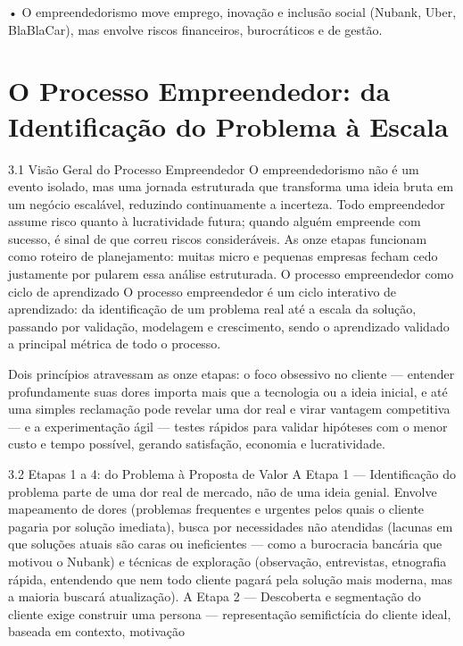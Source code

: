 • O empreendedorismo move emprego, inovação e inclusão social (Nubank, Uber, BlaBlaCar), mas envolve riscos financeiros, burocráticos e de gestão.

\chapter{O Processo Empreendedor: da Identificação do Problema à Escala}

3.1 Visão Geral do Processo Empreendedor O empreendedorismo não é um evento isolado, mas uma jornada estruturada que transforma uma ideia bruta em um negócio escalável, reduzindo continuamente a incerteza. Todo empreendedor assume risco quanto à lucratividade futura; quando alguém empreende com sucesso, é sinal de que correu riscos consideráveis. As onze etapas funcionam como roteiro de planejamento: muitas micro e pequenas empresas fecham cedo justamente por pularem essa análise estruturada. O processo empreendedor como ciclo de aprendizado O processo empreendedor é um ciclo interativo de aprendizado: da identificação de um problema real até a escala da solução, passando por validação, modelagem e crescimento, sendo o aprendizado validado a principal métrica de todo o processo.

Dois princípios atravessam as onze etapas: o foco obsessivo no cliente — entender profundamente suas dores importa mais que a tecnologia ou a ideia inicial, e até uma simples reclamação pode revelar uma dor real e virar vantagem competitiva — e a experimentação ágil — testes rápidos para validar hipóteses com o menor custo e tempo possível, gerando satisfação, economia e lucratividade.

3.2 Etapas 1 a 4: do Problema à Proposta de Valor A Etapa 1 — Identificação do problema parte de uma dor real de mercado, não de uma ideia genial. Envolve mapeamento de dores (problemas frequentes e urgentes pelos quais o cliente pagaria por solução imediata), busca por necessidades não atendidas (lacunas em que soluções atuais são caras ou ineficientes — como a burocracia bancária que motivou o Nubank) e técnicas de exploração (observação, entrevistas, etnografia rápida, entendendo que nem todo cliente pagará pela solução mais moderna, mas a maioria buscará atualização). A Etapa 2 — Descoberta e segmentação do cliente exige construir uma persona — representação semifictícia do cliente ideal, baseada em contexto, motivação

